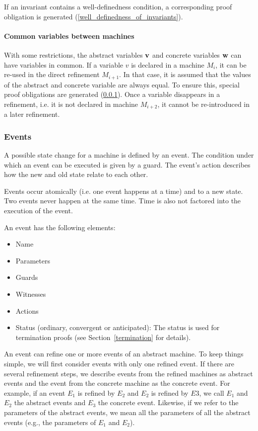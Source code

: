 If an invariant contains a well-definedness condition, 
  a corresponding proof obligation is generated (\ref{well_definedness_of_invariants}).

\paragraph{Common variables between machines}
\label{common_variables}
With some restrictions, the abstract variables $\mathbf{v}$ and concrete
  variables $\mathbf{w}$ can have variables in common.
If a variable $v$ is declared in a machine $M_i$, it can be re-used in the
  direct refinement $M_{i+1}$. 
In that case, it is assumed that the values of the abstract and concrete variable 
  are always equal.
To ensure this, special proof obligations are generated (\ref{events}).
Once a variable disappears in a refinement, i.e. it is not declared in machine $M_{i+2}$,
  it cannot be re-introduced in a later refinement.

\subsubsection{Events}
\label{events}
A possible state change for a machine is defined by an event.
The condition under which an event can be executed is given by a guard. The event's action
describes how the new and old state relate to each other.

Events occur atomically (i.e. one event happens at a time) and to a new state.
Two events never happen at the same time. Time is also not factored into the execution of the event.

An event has the following elements:
\begin{itemize}
\item Name
\item Parameters
\item Guards
\item Witnesses
\item Actions
\item Status (ordinary, convergent or anticipated): The status is used
  for termination proofs (see Section~\ref{termination} for details).
\end{itemize}

An event can refine one or more events of an abstract machine. To keep things simple, we will
  first consider events with only one refined event.
If there are several refinement steps, we describe events from the refined machines as abstract events and the event from the concrete machine as the concrete event. For example, if an event $E_1$ is refined by $E_2$ and $E_2$ is refined by
  $E3$, we call $E_1$ and $E_2$ the abstract events and $E_3$ the concrete event.
Likewise, if we refer to the parameters of the abstract events, we mean all the parameters
  of all the abstract events (e.g., the parameters of $E_1$ and $E_2$).

